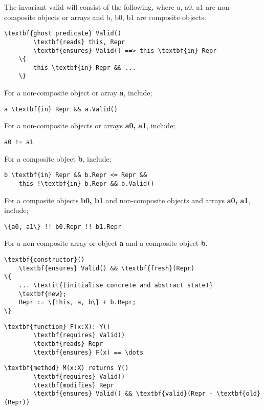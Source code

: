 The invariant valid will consist of the following, where a, a0, a1 are non-composite objects or arrays and b, b0, b1 are composite objects.
\begin{Verbatim}[commandchars=\\\{\}]
    \textbf{ghost predicate} Valid()
        \textbf{reads} this, Repr
        \textbf{ensures} Valid() ==> this \textbf{in} Repr
    \{ 
        this \textbf{in} Repr && ...
    \}
\end{Verbatim}

For a non-composite object or array \textbf{a}, include;
\begin{Verbatim}[commandchars=\\\{\}]
    a \textbf{in} Repr && a.Valid()
\end{Verbatim}

For a non-composite objects or arrays \textbf{a0, a1}, include;
\begin{Verbatim}[commandchars=\\\{\}]
    a0 != a1
\end{Verbatim}

For a composite object \textbf{b}, include;
\begin{Verbatim}[commandchars=\\\{\}]
    b \textbf{in} Repr && b.Repr <= Repr && 
    this !\textbf{in} b.Repr && b.Valid()
\end{Verbatim}

For a composite objects \textbf{b0, b1} and non-composite objects and arrays \textbf{a0, a1}, include;
\begin{Verbatim}[commandchars=\\\{\}]
    \{a0, a1\} !! b0.Repr !! b1.Repr  
\end{Verbatim}

For a non-composite array or object \textbf{a} and a composite object \textbf{b}.
\begin{Verbatim}[commandchars=\\\{\}]
\textbf{constructor}()
    \textbf{ensures} Valid() && \textbf{fresh}(Repr)
\{
    ... \textit{(initialise concrete and abstract state)}
    \textbf{new};
    Repr := \{this, a, b\} + b.Repr;
\}
\end{Verbatim}

\begin{Verbatim}[commandchars=\\\{\}]
    \textbf{function} F(x:X): Y()
        \textbf{requires} Valid()
        \textbf{reads} Repr
        \textbf{ensures} F(x) == \dots
\end{Verbatim}

\begin{Verbatim}[commandchars=\\\{\}]
    \textbf{method} M(x:X) returns Y()
        \textbf{requires} Valid()
        \textbf{modifies} Repr
        \textbf{ensures} Valid() && \textbf{valid}(Repr - \textbf{old}(Repr))
\end{Verbatim}
